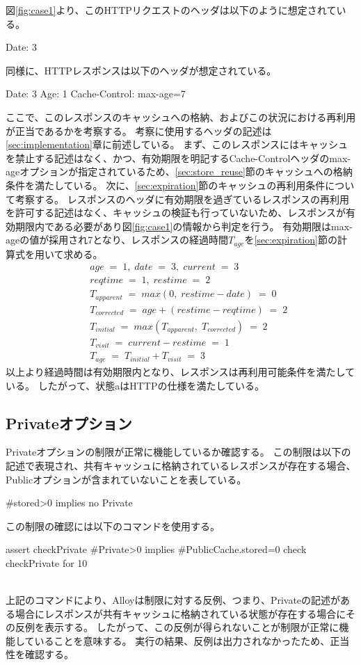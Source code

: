 \documentclass{css}
\begin{document}
図\ref{fig:case1}より、このHTTPリクエストのヘッダは以下のように想定されている。
\begin{verbatimtab}[4]
	Date: 3
\end{verbatimtab}
同様に、HTTPレスポンスは以下のヘッダが想定されている。
\begin{verbatimtab}[4]
	Date: 3
	Age: 1
	Cache-Control: max-age=7
\end{verbatimtab}
ここで、このレスポンスのキャッシュへの格納、およびこの状況における再利用が正当であるかを考察する。
考察に使用するヘッダの記述は\ref{sec:implementation}章に前述している。
まず、このレスポンスにはキャッシュを禁止する記述はなく、かつ、有効期限を明記するCache-Controlヘッダのmax-ageオプションが指定されているため、\ref{sec:store_reuse}節のキャッシュへの格納条件を満たしている。
次に、\ref{sec:expiration}節のキャッシュの再利用条件について考察する。
レスポンスのヘッダに有効期限を過ぎているレスポンスの再利用を許可する記述はなく、キャッシュの検証も行っていないため、レスポンスが有効期限内である必要があり図\ref{fig:case1}の情報から判定を行う。
有効期限はmax-ageの値が採用され7となり、レスポンスの経過時間$T_{age}$を\ref{sec:expiration}節の計算式を用いて求める。
\begin{eqnarray*}
&&age\;=\;1,\; date\;=\;3,\; current\;=\;3\\
&&reqtime\;=\;1,\; restime\;=\;2\\
&&T_{apparent}\;=\;max(0,\;restime - date)\;=\;0\\
&&T_{corrected}\;=\;age + (restime - reqtime)\;=\;2\\
&&T_{initial}\;=\;max(T_{apparent},\;T_{corrected})\;=\;2\\
&&T_{visit}\;=\;current - restime\;=\;1\\
&&T_{age}\;=\;T_{initial} + T_{visit}\;=\;3
\end{eqnarray*}
以上より経過時間は有効期限内となり、レスポンスは再利用可能条件を満たしている。
したがって、状態aはHTTPの仕様を満たしている。

\color{red}
\subsection{Privateオプション}
Privateオプションの制限が正常に機能しているか確認する。
この制限は以下の記述で表現され、共有キャッシュに格納されているレスポンスが存在する場合、Publicオプションが含まれていないことを表している。
\begin{verbatimtab}[2]
	#stored>0 implies no Private
\end{verbatimtab}
この制限の確認には以下のコマンドを使用する。\\\hrulefill
\begin{small}
\begin{verbatimtab}[2]
assert checkPrivate{
	#Private>0 implies #PublicCache.stored=0
}
check checkPrivate for 10
\end{verbatimtab}
\end{small}
\hrulefill\\
上記のコマンドにより、Alloyは制限に対する反例、つまり、Privateの記述がある場合にレスポンスが共有キャッシュに格納されている状態が存在する場合にその反例を表示する。
したがって、この反例が得られないことが制限が正常に機能していることを意味する。
実行の結果、反例は出力されなかったため、正当性を確認する。
\end{document}
